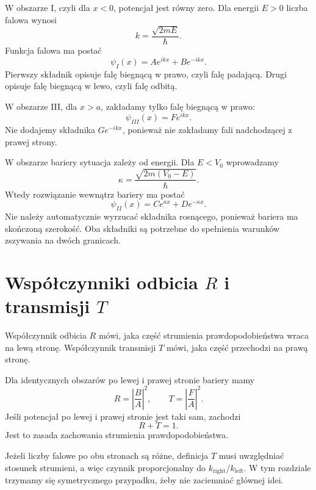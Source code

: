 W obszarze I, czyli dla \(x<0\), potencjał jest równy zero. Dla energii \(E>0\) liczba falowa wynosi
\[
    k=\frac{\sqrt{2mE}}{\hbar}.
\]
Funkcja falowa ma postać
\begin{equation}
    \psi_I(x)=A e^{ikx}+B e^{-ikx}.
\end{equation}
Pierwszy składnik opisuje falę biegnącą w prawo, czyli falę padającą. Drugi opisuje falę biegnącą w lewo, czyli falę odbitą.

W obszarze III, dla \(x>a\), zakładamy tylko falę biegnącą w prawo:
\begin{equation}
    \psi_{III}(x)=F e^{ikx}.
\end{equation}
Nie dodajemy składnika \(G e^{-ikx}\), ponieważ nie zakładamy fali nadchodzącej z prawej strony.

W obszarze bariery sytuacja zależy od energii. Dla \(E<V_0\) wprowadzamy
\[
    \kappa=\frac{\sqrt{2m(V_0-E)}}{\hbar}.
\]
Wtedy rozwiązanie wewnątrz bariery ma postać
\begin{equation}
    \psi_{II}(x)=C e^{\kappa x}+D e^{-\kappa x}.
\end{equation}
Nie należy automatycznie wyrzucać składnika rosnącego, ponieważ bariera ma skończoną szerokość. Oba składniki są potrzebne do spełnienia warunków zszywania na dwóch granicach.

\section{Współczynniki odbicia \texorpdfstring{\(R\)}{R} i transmisji \texorpdfstring{\(T\)}{T}}

Współczynnik odbicia \(R\) mówi, jaka część strumienia prawdopodobieństwa wraca na lewą stronę. Współczynnik transmisji \(T\) mówi, jaka część przechodzi na prawą stronę.

Dla identycznych obszarów po lewej i prawej stronie bariery mamy
\begin{equation}
    R=\left|\frac{B}{A}\right|^2,
    \qquad
    T=\left|\frac{F}{A}\right|^2.
\end{equation}
Jeśli potencjał po lewej i prawej stronie jest taki sam, zachodzi
\begin{equation}
    R+T=1.
\end{equation}
Jest to zasada zachowania strumienia prawdopodobieństwa.

Jeżeli liczby falowe po obu stronach są różne, definicja \(T\) musi uwzględniać stosunek strumieni, a więc czynnik proporcjonalny do \(k_{\mathrm{right}}/k_{\mathrm{left}}\). W tym rozdziale trzymamy się symetrycznego przypadku, żeby nie zaciemniać głównej idei.

